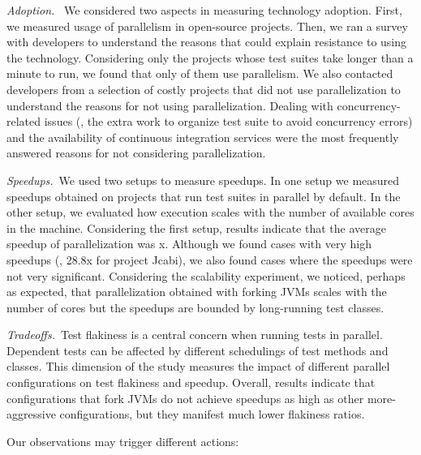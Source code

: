 \documentclass[10pt,journal,compsoc]{IEEEtran}
\begin{document}
\noindent\emph{Adoption.}~ We considered two aspects in measuring technology
adoption.  First, we measured usage of parallelism in open-source projects.
Then, we ran a survey with developers to understand the reasons that could
explain resistance to using the technology.
Considering only the projects whose test suites take longer than a minute to
run, we found that only \percentParallelUpdated{} of them use parallelism.  We
also contacted developers from a selection of costly projects that did not use
parallelization to understand the reasons for not using parallelization.
Dealing with concurrency-related issues (\eg{}, the extra work to organize test
suite to avoid concurrency errors) and the availability of continuous
integration services were the most frequently answered reasons for not
considering parallelization.

\noindent\emph{Speedups.}~We used two setups to measure speedups.  In one setup
we measured speedups obtained on projects that run test suites in parallel by
default.  In the other setup, we evaluated how execution scales with the number
of available cores in the machine.  Considering the first
setup, results indicate that the average speedup of parallelization was
\avgSpeedup{}x.  Although we found cases with very high speedups (\eg{}, 28.8x
for project Jcabi), we also found cases where the speedups were not very
significant.  Considering the scalability experiment, we noticed, perhaps as
expected, that parallelization obtained with forking JVMs scales with the number
of cores but the speedups are bounded by long-running test classes.

\noindent\emph{Tradeoffs.}~Test flakiness is a central concern when running
tests in parallel.  Dependent tests can be affected by different schedulings of
test methods and classes.  This dimension of the study measures the impact of
different parallel configurations on test flakiness and speedup.  Overall,
results indicate that configurations that fork JVMs do not achieve speedups as
high as other more-aggressive configurations, but they manifest much lower
flakiness ratios.

Our observations may trigger different actions:
\end{document}
